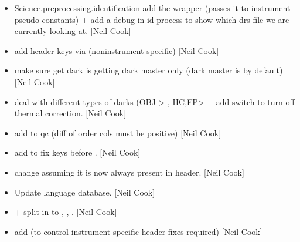 \documentclass[a4paper,10pt,english]{report}
\begin{document}
\label{\detokenize{misc/changelog:id47}}\begin{itemize}
\item {} 
Science.preprocessing.identification \sphinxhyphen{} add the  wrapper
(passes it to instrument pseudo constants) + add a debug in id process
to show which drs file we are currently looking at. {[}Neil Cook{]}

\item {} 
 \sphinxhyphen{} add header keys via 
(non\sphinxhyphen{}instrument specific) {[}Neil Cook{]}

\item {} 
 \sphinxhyphen{} make sure get dark is getting dark master only
(dark master is  by default) {[}Neil Cook{]}

\item {} 
 \sphinxhyphen{} deal with different types of darks (OBJ \textendash{}\textgreater{}
, HC,FP\textendash{}\textgreater{}  + add switch to turn off thermal
correction. {[}Neil Cook{]}

\item {} 
 \sphinxhyphen{} add  to qc (diff of order
cols must be positive) {[}Neil Cook{]}

\item {} 
 \sphinxhyphen{} add  to fix keys before
. {[}Neil Cook{]}

\item {} 
 \sphinxhyphen{} change  assuming it is now always
present in header. {[}Neil Cook{]}

\item {} 
Update language database. {[}Neil Cook{]}

\item {} 
 +  \sphinxhyphen{} split
 in to , , . {[}Neil
Cook{]}

\item {} 
 \sphinxhyphen{} add  (to control
instrument specific header fixes required) {[}Neil Cook{]}


\end{itemize}
\end{document}
